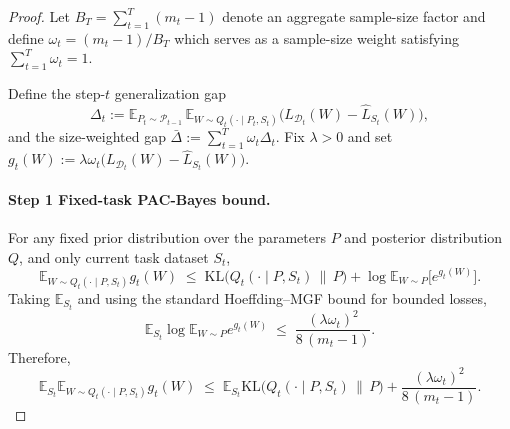 \documentclass{article}
\begin{document}
\begin{proof}
    


Let $B_T=\sum_{t=1}^T (m_t-1)$ denote an aggregate sample-size factor and define $\omega_t=(m_t-1)/B_T$ which serves as a sample-size weight satisfying $\sum_{t=1}^T\omega_t=1$.



Define the step-$t$ generalization gap
\[
\Delta_t
:=\mathbb E_{P_t\sim\mathcal P_{t-1}}\,
\mathbb E_{W\sim Q_t(\cdot\mid P_t,S_t)}
\big(L_{\mathcal D_t}(W)-\hat L_{S_t}(W)\big),
\]
and the size-weighted gap $\bar\Delta:=\sum_{t=1}^T \omega_t \Delta_t$.
Fix $\lambda>0$ and set
\(
g_t(W):=\lambda\omega_t\big(L_{\mathcal D_t}(W)-\hat L_{S_t}(W)\big).
\)

\paragraph{Step 1 Fixed-task PAC-Bayes bound.}
For any fixed prior distribution over the parameters $P$ and posterior distribution $Q$, and only current task dataset $S_t$,   
\begin{equation}
\label{eq:dv-w}
\mathbb E_{W\sim Q_t(\cdot\mid P,S_t)} g_t(W)
\;\le\;
\mathrm{KL}\!\big(Q_t(\cdot\mid P,S_t)\,\|\,P\big)
+\log\mathbb E_{W\sim P}\!\big[e^{g_t(W)}\big].
\end{equation}
Taking $\mathbb E_{S_t}$ and using the standard Hoeffding--MGF bound for bounded losses,
\begin{equation}
\label{eq:mgf-mean-gap}
\mathbb E_{S_t}\log\mathbb E_{W\sim P} e^{g_t(W)}
\;\le\; \frac{(\lambda\omega_t)^2}{8\,(m_t-1)}.
\end{equation}
Therefore,
\begin{equation}
\label{eq:model-step}
\mathbb E_{S_t}\mathbb E_{W\sim Q_t(\cdot\mid P,S_t)} g_t(W)
\;\le\;
\mathbb E_{S_t}\mathrm{KL}\!\big(Q_t(\cdot\mid P,S_t)\,\|\,P\big)
+\frac{(\lambda\omega_t)^2}{8\,(m_t-1)}.
\end{equation}

\end{proof}
\end{document}
